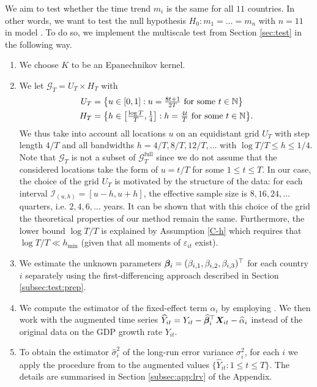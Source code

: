 \documentclass[a4paper,12pt]{article}
\makeatletter
\renewcommand{\eqref}[1]{\tagform@{\ref{#1}}}
\makeatother
\begin{document}
We aim to test whether the time trend $m_i$ is the same for all $11$ countries. In other words, we want to test the null hypothesis $H_0: m_1 = \ldots = m_n$ with $n = 11$ in model \eqref{eq:model:app2}. To do so, we implement the multiscale test from Section \ref{sec:test} in the following way. 

\begin{enumerate}
\item We choose $K$ to be an Epanechnikov kernel.
\item We let $\mathcal{G}_T = U_T \times H_T$ with 
\begin{align*}
U_T & = \big\{ u \in [0,1]: u = \textstyle{\frac{8t + 1}{2T}} \text{ for some } t \in \mathbb{N} \big\} \\
H_T & = \big\{ h \in \big[ \textstyle{\frac{\log T}{T}}, \textstyle{\frac{1}{4}} \big]:  h = \textstyle{\frac{4t}{T}} \text{ for some } t \in \mathbb{N} \big\}. 
\end{align*}
We thus take into account all locations $u$ on an equidistant grid $U_T$ with step length $4/T$ and all bandwidths $h=4/T, 8/T, 12/T,\ldots$ with $\log T /T \le h \le 1/4$. Note that $\mathcal{G}_T$ is not a subset of $\mathcal{G}_T^{\text{full}}$ since we do not assume that the considered locations take the form of $u = t/T$ for some $1 \leq t \leq T$. In our case, the choice of the grid $U_T$ is motivated by the structure of the data: for each interval $\mathcal{I}_{(u, h)} = [u-h, u+h]$, the effective sample size is $8, 16, 24, \ldots$ quarters, i.e. $2, 4, 6, \ldots$ years. It can be shown that with this choice of the grid the theoretical properties of our method remain the same. Furthermore, the lower bound $\log T / T$ is explained by Assumption \ref{C-h} which requires that $\log T /T \ll h_{\min}$ (given that all moments of $\varepsilon_{it}$ exist).
\item We estimate the unknown parameters $\bm{\beta}_i = (\beta_{i, 1}, \beta_{i, 2}, \beta_{i, 3})^\top$ for each country $i$ separately using the first-differencing approach described in Section \ref{subsec:test:prep}.
\item We compute the estimator of the fixed-effect term $\alpha_i$ by employing \eqref{eq:alpha:est}. We then work with the augmented time series $\widehat{Y}_{it} = Y_{it} - \widehat{\bm{\beta}}_i^\top \boldsymbol{X}_{it} - \widehat{\alpha}_{i}$ instead of the original data on the GDP growth rate $Y_{it}$.
\item To obtain the estimator $\hat{\sigma}_i^2$ of the long-run error variance $\sigma^2_i$, for each $i$ we apply the procedure from \cite{KhismatullinaVogt2020} to the augmented values \linebreak $\{\widehat{Y}_{it}: 1\leq t \leq T\}$. The details are summarised in Section \ref{subsec:app:lrv} of the Appendix. %

\end{enumerate}
\end{document}
